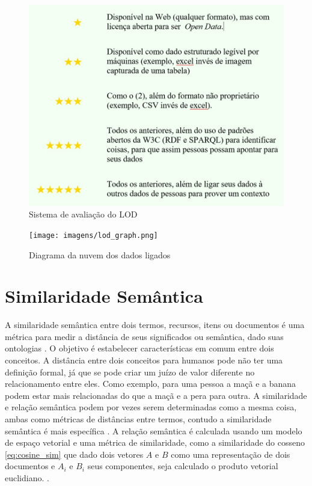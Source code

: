 \begin{figure}
	\centering
	\includegraphics[scale=0.50]{imagens/lod_rating.jpg}
	\caption{Sistema de avaliação do LOD \citep{SemanticWebStack}}
	\label{fig:lod-rating}
\end{figure}

\begin{figure}
	\centering
	\texttt{[image: imagens/lod\_graph.png]}
	\caption{Diagrama da nuvem dos dados ligados \citep{LODGraph}}
	\label{fig:lod-graph}
\end{figure}

\section{Similaridade Semântica}

A similaridade semântica entre dois termos, recursos, itens ou documentos é uma métrica para medir a distância de seus significados ou semântica, dado suas ontologias \citep{Slimani2013}. O objetivo é estabelecer características em comum entre dois conceitos. A distância entre dois conceitos para humanos pode não ter uma definição formal, já que se pode criar um juízo de valor diferente no relacionamento entre eles. Como exemplo, para uma pessoa a maçã e a banana podem estar mais relacionadas do que a maçã e a pera para outra. A similaridade e relação semântica podem por vezes serem determinadas como a mesma coisa, ambas como métricas de distâncias entre termos, contudo a similaridade semântica é mais específica \citep{Slimani2013}. A relação semântica é calculada usando um modelo de espaço vetorial e uma métrica de similaridade, como a similaridade do cosseno \ref{eq:cosine_sim} que dado dois vetores $A$ e $B$ como uma representação de dois documentos e $A_i$ e $B_i$ seus componentes, seja calculado o produto vetorial euclidiano. \citep{Singhal2001}.

